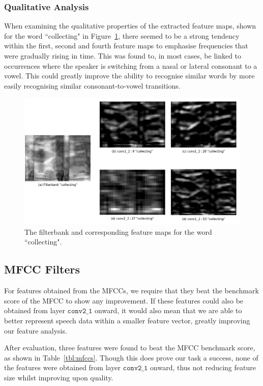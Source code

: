 \subsubsection{Qualitative Analysis}

When examining the qualitative properties of the extracted feature maps, shown for the word ``collecting" in Figure~\ref{fig:fbank_features}, there seemed to be a strong tendency within the first, second and fourth feature maps to emphasise frequencies that were gradually rising in time.
This was found to, in most cases, be linked to occurrences where the speaker is switching from a nasal or lateral consonant to a vowel.
This could greatly improve the ability to recognise similar words by more easily recognising similar consonant-to-vowel transitions.

\begin{figure}[ht]
    \centering
    \includegraphics[width=0.5\linewidth]{content/fig/fbank_features.png}
    \caption{The filterbank and corresponding feature maps for the word ``collecting".}
    \label{fig:fbank_features}
\end{figure}

\subsection{MFCC Filters}
\label{chap:mfcc_filters}

For features obtained from the MFCCs, we require that they beat the benchmark score of the MFCC to show any improvement.
If these features could also be obtained from layer $\mathtt{conv2\_1}$ onward, it would also mean that we are able to better represent speech data within a smaller feature vector, greatly improving our feature analysis.

After evaluation, three features were found to beat the MFCC benchmark score, as shown in Table~\ref{tbl:mfccs}. 
Though this does prove our task a success, none of the features were obtained from layer $\mathtt{conv2\_1}$ onward, thus not reducing feature size whilst improving upon quality.

